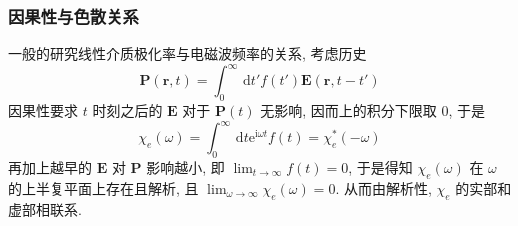 \documentclass[12pt,a4paper]{article}%
\numberwithin{equation}{section}%
\renewcommand*{\vec}[1]{\bm{#1}}%
\newcommand{\dif}{\,\mathrm d}
\newcommand\mi{\mathrm{i}}
\newcommand\e{\mathrm{e}}%
\begin{document}
\subsubsection{因果性与色散关系} %
\label{ssub:causality}
一般的研究线性介质极化率与电磁波频率的关系, 考虑历史
\begin{equation}
    \vec P(\vec r,t) =\int_0^\infty\dif t' f(t')\vec E(\vec r,t-t')
\end{equation}
因果性要求 $t$ 时刻之后的 $\vec E$ 对于 $\vec P(t)$ 无影响, 因而上的积分下限取 $0$, 于是
\begin{equation}
    \chi_e(\omega) = \int_0^\infty\dif t\e^{\mi\omega t}f(t) = \chi^*_e(-\omega)
\end{equation}
再加上越早的 $\vec E$ 对 $\vec P$ 影响越小, 即 $\lim_{t\to\infty} f(t) = 0$, 于是得知 $\chi_e(\omega)$ 在 $\omega$ 的上半复平面上存在且解析, 且 $\lim_{\omega\to\infty}\chi_e(\omega) = 0$. 从而由解析性, $\chi_e$ 的实部和虚部相联系.
\end{document}

